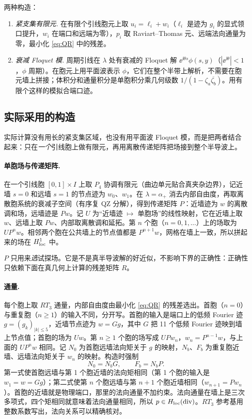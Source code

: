 \documentclass[11pt,a4paper,fontset=fandol]{ctexart}
\begin{document}
两种构造：
\begin{enumerate}
\item \emph{紧支集有限元.} 在有限个引线胞元上取 $u_i=\ell_i+w_i$（$\ell_i$ 是迹为 $g_i$ 的显式领口提升，$w_i$ 在端口和远端为零），$p_i$ 取 Raviart--Thomas 元、远端法向通量为零，最小化 \eqref{eq:QR} 中的残差。
\item \emph{衰减 Floquet 模.} 周期引线在 $\lambda$ 处有衰减的 Floquet 解 $\ee^{\ii\theta s}\phi(s,y)$（$|\ee^{\ii\theta}|<1$，$\phi$ 周期）。在胞元上用平面波表示 $\phi$，它们在整个半带上解析，不需要在胞元墙上拼接；体积分和通量积分是单胞积分乘几何级数 $1/(1-\zeta_a\overline{\zeta_b})$。用有限个这样的模拟合端口迹。
\end{enumerate}

\subsection{实际采用的构造}

实际计算没有用长的紧支集区域，也没有用平面波 Floquet 模，而是把两者结合起来：只在\emph{一个}引线胞上做有限元，再用离散传递矩阵把场接到整个半导波上。

\paragraph{单胞场与传递矩阵.} 在一个引线胞 $[0,1]\times I$ 上取 $P_4$ 协调有限元（曲边单元贴合真夹杂边界），记近墙 $s=0$ 和远墙 $s=1$ 的节点迹为 $w_0$、$w_1$。在 $\lambda=\alpha_+$ 消去内部自由度，再取离散胞系统的衰减子空间（有序复 QZ 分解），得到传递矩阵 $P$：近墙迹为 $w$ 的离散调和场，远墙迹是 $Pw$。记 $U$ 为“近墙迹 $\mapsto$ 单胞场”的线性映射，它在近墙上取 $w$、远墙上取 $Pw$、内部取离散调和延拓。第 $n$ 个胞（$n=0,1,\dots$）上的场取为 $UP^nw$。相邻两个胞在公共墙上的节点值都是 $P^{n+1}w$，网格在墙上一致，所以拼起来的场在 $H^1_{\rm loc}$ 中。

$P$ 只用来\emph{选}试探场。它是不是真半导波解的好近似，不影响下界的正确性：正确性只依赖下面在真几何上计算的残差矩阵 $R$。

\paragraph{通量.} 每个胞上取 $RT_3$ 通量，内部自由度由最小化 \eqref{eq:QR} 的残差选出。首胞（$n=0$）与重复胞（$n\ge1$）的输入不同，分开写。首胞的输入是端口上的低频 Fourier 迹 $g=(g_k)_{|k|\le5}$，近墙节点迹为 $w=Gg$，其中 $G$ 把 11 个低频 Fourier 迹映到墙上节点值；首胞的场为 $Uw$。第 $n\ge1$ 个胞的场写成 $UPw_n$，$w_n=P^{n-1}w$，与上面的 $UP^nw$ 相同。记 $N_0$ 为首胞远墙法向矩关于 $g$ 的映射，$N_b$、$F_b$ 为重复胞近墙、远墙法向矩关于 $w_n$ 的映射。构造时强制
\[
N_0=N_bG,\qquad F_b=N_bP .
\]
第一式使首胞远墙与第 1 个胞近墙的法向矩相同（第 1 个胞的输入是 $w_1=w=Gg$）；第二式使第 $n$ 个胞远墙与第 $n+1$ 个胞近墙相同（$w_{n+1}=Pw_n$）。首胞的近墙就是物理端口，那里的法向通量不加约束。法向通量在墙上是三次多项式，四个矩相同就意味着法向通量相同，所以 $p\in H_{\rm loc}(\operatorname{div})$。$RT_3$ 参考基用整数系数写出，法向关系可以精确核对。
\end{document}
